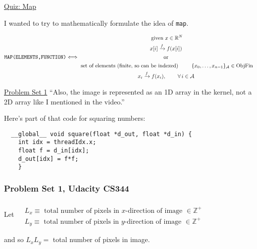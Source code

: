 \documentclass[10pt]{amsart}
\begin{document}
\begin{multicols*}{2}
\href{https://classroom.udacity.com/courses/cs344/lessons/55120467/concepts/673071460923#}{Quiz: Map}

I wanted to try to mathematically formulate the idea of \verb|map|.

\[
\begin{gathered}
  \verb|MAP(ELEMENTS,FUNCTION)|
  \end{gathered} \Longleftrightarrow
\begin{gathered}
\begin{gathered}
  \text{ given } x \in \mathbb{R}^N \\ 
  x[i] \xrightarrow{ f } f(x[i]) 
\end{gathered} \\
\text{ or } \\ 
\begin{gathered}
  \text{ set of elements (finite, so can be indexed) } \qquad \, \lbrace x_0 , \dots , x_{n-1} \rbrace_{\mathcal{A}} \in \text{Obj}\mathbf{ \text{Fin} } \\
  x_i \xrightarrow{ f } f(x_i) , \qquad \, \forall \, i \in \mathcal{A}
  \end{gathered}
  \end{gathered}
\]

\href{https://classroom.udacity.com/courses/cs344/lessons/55120467/concepts/967066740923}{Problem Set 1}
``Also, the image is represented as an 1D array in the kernel, not a 2D array like I mentioned in the video.''

Here's part of that code for squaring numbers:
\begin{lstlisting}
  __global__ void square(float *d_out, float *d_in) {
    int idx = threadIdx.x;
    float f = d_in[idx];
    d_out[idx] = f*f;
    }
  \end{lstlisting}

\subsubsection{Problem Set 1, Udacity CS344}

Let $\begin{aligned} & \quad \\
  & L_x \equiv \text{ total number of pixels in $x$-direction of image } \in \mathbb{Z}^+ \\
   & L_y \equiv \text{ total number of pixels in $y$-direction of image } \in \mathbb{Z}^+ \end{aligned}$

and so $L_x L_y  = $ total number of pixels in image.


\end{multicols*}
\end{document}
